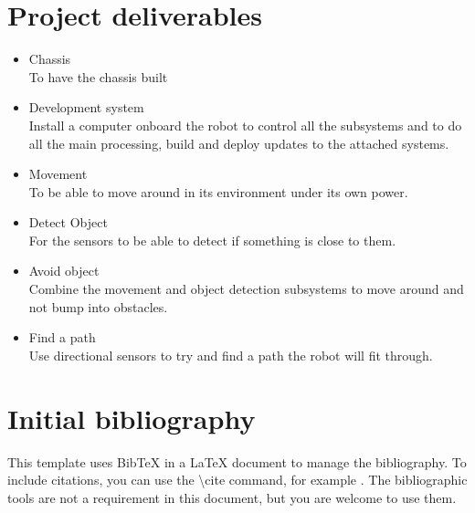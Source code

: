 \documentclass[11pt,fleqn,twoside]{article}
\begin{document}

\section{Project deliverables}
\begin{itemize}
\item Chassis
\\To have the chassis built
\item Development system
\\Install a computer onboard the robot to control all the subsystems and to do all the main processing, build and deploy updates to the attached systems.
\item Movement
\\To be able to move around in its environment under its own power.
\item Detect Object
\\For the sensors to be able to detect if something is close to them.
\item Avoid object
\\Combine the movement and object detection subsystems to move around and not bump into obstacles.
\item Find a path
\\Use directional sensors to try and find a path the robot will fit through.
\end{itemize}

\section{Initial bibliography}

This template uses BibTeX in a LaTeX document to manage the bibliography. To include citations, you 
can use the \textbackslash cite command, for example \cite{NumericalRecipes}\cite{MarksPaper}\cite{FailBlog}\cite{kittenpic_ref}.  The bibliographic tools are not a requirement in this document, but you are welcome to use them.  


\renewcommand{\refname}{}  %
\end{document}
